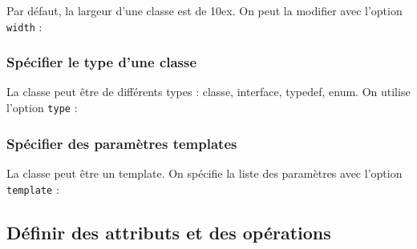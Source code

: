 \documentclass[a4paper,11pt]{report}
\newcommand{\inputTikZ}[1]{%
  }%
\newcommand{\inputTikZ}[1]{%
    \texttt{[image: fig/\#1.pdf]}%
  }%
\begin{document}
Par défaut, la largeur d'une classe est de 10ex. On peut la modifier avec l'option {\tt width} :

\medskip

\begin{minipage}{0.5\textwidth}

\end{minipage}
\begin{minipage}{0.4\textwidth}
\begin{center}
\inputTikZ{figure4}
\end{center}
\end{minipage}

\subsubsection{Spécifier le type d'une classe}

La classe peut être de différents types : classe, interface, typedef, enum. On utilise l'option {\tt type} :

\medskip

\begin{minipage}{0.5\textwidth}

\end{minipage}
\begin{minipage}{0.4\textwidth}
\begin{center}
\inputTikZ{figure5}
\end{center}
\end{minipage}

\subsubsection{Spécifier des paramètres templates}

La classe peut être un template. On spécifie la liste des paramètres avec l'option {\tt template} :

\medskip

\begin{minipage}{0.5\textwidth}

\end{minipage}
\begin{minipage}{0.4\textwidth}
\begin{center}
\inputTikZ{figure6}
\end{center}
\end{minipage}

\subsection{Définir des attributs et des opérations}
\end{document}
